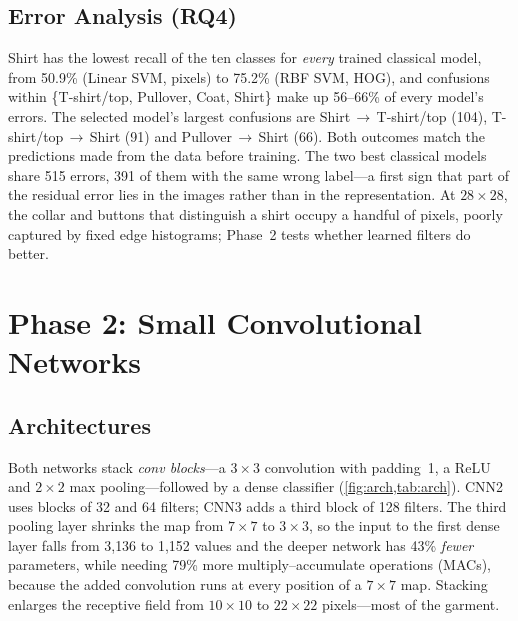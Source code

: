 \documentclass[conference]{IEEEtran}
\newcommand{\arrowc}{\,$\rightarrow$\,}
\begin{document}
\subsection{Error Analysis (RQ4)}
Shirt has the lowest recall of the ten classes for \emph{every} trained classical model, from 50.9\% (Linear SVM, pixels)
to 75.2\% (RBF SVM, HOG), and confusions within \{T-shirt/top, Pullover, Coat, Shirt\} make up 56--66\% of every model's
errors. The selected model's largest confusions are Shirt\arrowc T-shirt/top (104), T-shirt/top\arrowc Shirt (91) and
Pullover\arrowc Shirt (66). Both outcomes match the predictions made from the data before training. The two best
classical models share 515 errors, 391 of them with the same wrong label---a first sign that part of the residual error
lies in the images rather than in the representation. At $28\times28$, the collar and buttons that distinguish a shirt
occupy a handful of pixels, poorly captured by fixed edge histograms; Phase~2 tests whether learned filters do better.

\section{Phase 2: Small Convolutional Networks}
\label{sec:phase2}

\subsection{Architectures}
\label{sec:cnn-arch}
Both networks stack \emph{conv blocks}---a $3\times3$ convolution with padding~1, a ReLU and $2\times2$ max
pooling---followed by a dense classifier (\cref{fig:arch,tab:arch}). CNN2 uses blocks of 32 and 64 filters; CNN3 adds a
third block of 128 filters. The third pooling layer shrinks the map from $7\times7$ to $3\times3$, so the input to the
first dense layer falls from 3{,}136 to 1{,}152 values and the deeper network has 43\% \emph{fewer} parameters, while
needing 79\% more multiply--accumulate operations (MACs), because the added convolution runs at every position of a
$7\times7$ map. Stacking enlarges the receptive field from $10\times10$ to $22\times22$ pixels---most of the garment.
\end{document}

